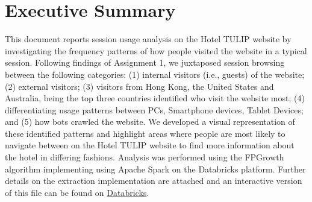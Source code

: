 \section*{Executive Summary}

This document reports session usage analysis on the Hotel TULIP website by investigating the frequency patterns of how people visited the website in a typical session. Following findings of Assignment 1, we juxtaposed session browsing between the following categories: (1) internal visitors (i.e., guests) of the website; (2) external visitors; (3) visitors from Hong Kong, the United States and Australia, being the top three countries identified who visit the website most; (4) differentiating usage patterns between PCs, Smartphone devices, Tablet Devices; and (5) how bots crawled the website. We developed a visual representation of these identified patterns and highlight areas where people are most likely to navigate between on the Hotel TULIP website to find more information about the hotel in differing fashions. Analysis was performed using the FPGrowth algorithm implementing using Apache Spark on the Databricks platform. Further details on the extraction implementation are attached and an interactive version of this file can be found on \href{\databricksurl}{Databricks}.